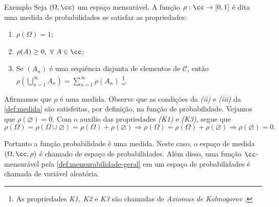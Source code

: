 \begin{env}{Exemplo}
	Seja $(\Omega, \cc)$ um espaço mensurável.
	A função $\rho:\cc \to [0,1]$ é dita uma medida de probabilidades se satisfaz as propriedades:
	\begin{enumerate}[label* =(\textit{K\arabic*})]
		\item $\rho(\Omega) = 1$;
		\item $\rho(A) \geq 0,\ \forall\  A \in \cc$;
		\item Se $(A_n)$ é uma sequência disjunta de elementos de  $\mathcal{C}$, então 
		$\displaystyle
		\rho\left(\bigcup_{n = 1}^\infty A_n\right) 
		= 
		\sum_{n = 1}^\infty\rho(A_n)
		$
		\footnote{
			As propriedades \textit{K1, K2} e \textit{K3} são chamadas de \textit{Axiomas de Kolmogorov} \cite{magalhaes}.
		}.
	\end{enumerate}
\end{env}

Afirmamos que $\rho$ é uma medida.
Observe que as condições da \textit{(ii)} e \textit{(iii)} da \ref{def:medida} são satisfeitas, por definição, na função de probabilidade.
Vejamos que $\rho(\varnothing) = 0$.
Com o auxilio das propriedades \textit{(K1)} e \textit{(K3)}, segue que 
$$
\rho(\Omega)
= 
\rho(\Omega \cup \varnothing)
= 
\rho(\Omega) + \rho(\varnothing)
\Rightarrow
\rho(\Omega)
= 
\rho(\Omega) + \rho(\varnothing)
\Rightarrow
\rho(\varnothing) = 0.
$$

Portanto a função probabilidade é uma medida.
Neste caso, o espaço de medida $(\Omega, \cc,\rho)$ é chamado de espaço de probabilidades.
Além disso, uma função $\cc$-mensurável pela \ref{def:mensurabilidade-geral} em um espaço de probabilidades é chamada de variável aleatória.

